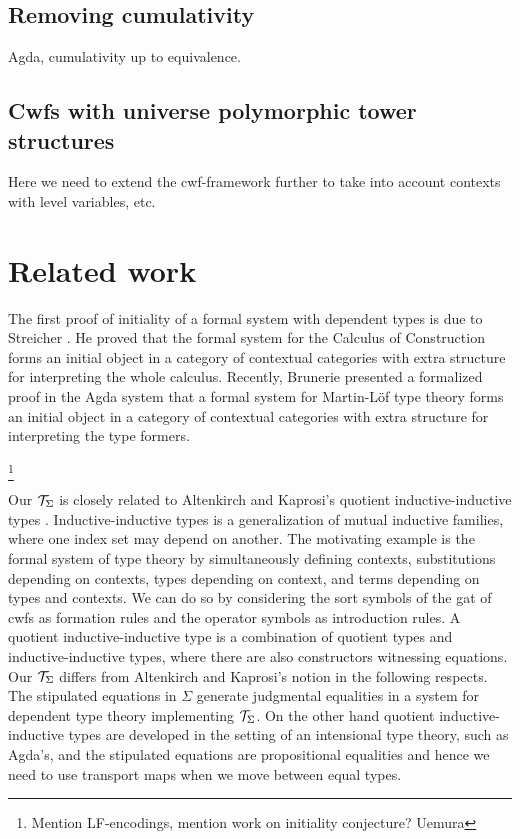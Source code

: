 \documentclass{lmcs}
\begin{document}
\subsection{Removing cumulativity} Agda, cumulativity up to equivalence.

\subsection{Cwfs with universe polymorphic tower structures} Here we need to extend the cwf-framework further to take into account contexts with level variables, etc.

\section{Related work}

The first proof of initiality of a formal system with dependent types is due to Streicher \cite{streicher:semtt}. He proved that the formal system for the Calculus of Construction forms an initial object in a category of contextual categories with extra structure for interpreting the whole calculus. Recently, Brunerie \cite{brunerie:initiality} presented a formalized proof in the Agda system that a formal system for Martin-Löf type theory forms an initial object in a category of contextual categories with extra structure for interpreting
the type formers.

\footnote{Mention LF-encodings, mention work on initiality conjecture? Uemura}

Our ${\mathcal T}_\Sigma$ is closely related to Altenkirch and Kaprosi's quotient inductive-inductive types \cite{altenkirch:qiits}. Inductive-inductive types \cite{nordvallforsberg:iids} is a generalization of mutual inductive families, where one index set may depend on another. The motivating example is the formal system of type theory by simultaneously defining contexts, substitutions depending on contexts, types depending on context, and terms depending on types and contexts. We can do so by considering the sort symbols of the gat of cwfs as formation rules and the operator symbols as introduction rules. A quotient inductive-inductive type is a combination of quotient types and inductive-inductive types, where there are also constructors witnessing equations. Our ${\mathcal T}_\Sigma$ differs from Altenkirch and Kaprosi's notion in the following respects. The stipulated equations in $\Sigma$ generate judgmental equalities in a system for dependent type theory implementing ${\mathcal T}_\Sigma$. On the other hand quotient inductive-inductive types are developed in the setting of an intensional type theory, such as Agda's, and the stipulated equations are propositional equalities and hence we need to use transport maps when we move between equal types. 
\end{document}
